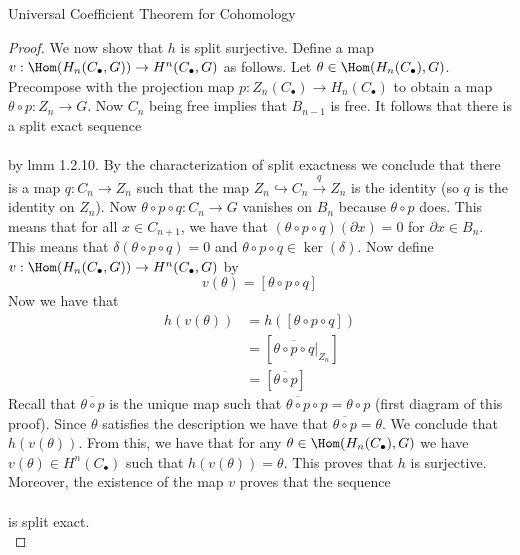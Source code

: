 \documentclass[a4paper]{article}
\begin{document}
\begin{thm}{Universal Coefficient Theorem for Cohomology}{}
\begin{proof}
We now show that $h$ is split surjective. Define a map $v:\Hom(H_n(C_\bullet,G))\to H^n(C_\bullet,G)$ as follows. Let $\theta\in\Hom(H_n(C_\bullet),G)$. Precompose with the projection map $p:Z_n(C_\bullet)\to H_n(C_\bullet)$ to obtain a map $\theta\circ p:Z_n\to G$.
Now $C_n$ being free implies that $B_{n-1}$ is free. It follows that there is a split exact sequence \\
\\
by lmm 1.2.10. By the characterization of split exactness we conclude that there is a map $q:C_n\to Z_n$ such that the map $Z_n\hookrightarrow C_n\overset{q}{\longrightarrow}Z_n$ is the identity (so $q$ is the identity on $Z_n$). Now $\theta\circ p\circ q:C_n\to G$ vanishes on $B_n$ because $\theta\circ p$ does. This means that for all $x\in C_{n+1}$, we have that $(\theta\circ p\circ q)(\partial x)=0$ for $\partial x\in B_n$. This means that $\delta(\theta\circ p\circ q)=0$ and $\theta\circ p\circ q\in\ker(\delta)$. Now define $v:\Hom(H_n(C_\bullet,G))\to H^n(C_\bullet,G)$ by $$v(\theta)=[\theta\circ p\circ q]$$ Now we have that 
\begin{align*}
h(v(\theta))&=h([\theta\circ p\circ q])\\
&=[\overline{\theta\circ p\circ q}|_{Z_n}]\\
&=[\overline{\theta\circ p}]\tag{$q$ is the identity on $Z_n$}
\end{align*}
Recall that $\overline{\theta\circ p}$ is the unique map such that $\overline{\theta\circ p}\circ p=\theta\circ p$ (first diagram of this proof). Since $\theta$ satisfies the description we have that $\overline{\theta\circ p}=\theta$. We conclude that $h(v(\theta))$. From this, we have that for any $\theta\in\Hom(H_n(C_\bullet),G)$ we have $v(\theta)\in H^n(C_\bullet)$ such that $h(v(\theta))=\theta$. This proves that $h$ is surjective. Moreover, the existence of the map $v$ proves that the sequence \\
\\
is split exact. \\


\end{proof}
\end{thm}
\end{document}
